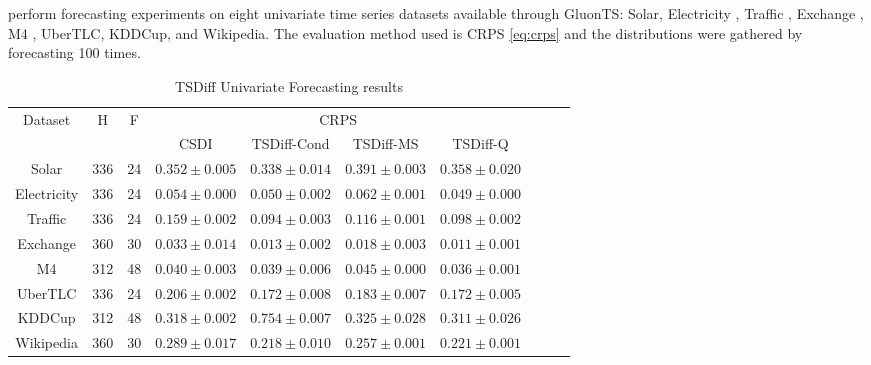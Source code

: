 \textcite{kollovieh_predict_2023} perform forecasting experiments on eight univariate time series datasets available through GluonTS: Solar\cite{lai_modeling_2018}, Electricity \cite{trindade_electricityloaddiagrams20112014_2015}, Traffic \cite{cuturi_pems-sf_2011}, Exchange \cite{lai_modeling_2018}, M4 \cite{makridakis_m4_2020}, UberTLC\cite{nyc_taxi_and_limousine_commission_tlc_2015}, KDDCup\cite{godahewa_monash_2021}, and Wikipedia\cite{gasthaus_probabilistic_2019}. The evaluation method used is CRPS \eqref{eq:crps} and the distributions were gathered by forecasting 100 times.
\begin{table}[ht]
    \centering
    \begin{tabular}{cccccccccc}
        \toprule
        \multirow{2}{*}{Dataset} & \multirow{2}{*}{H} & \multirow{2}{*}{F} & \multicolumn{4}{c}{CRPS} \\
        \cmidrule(lr){4-7}
         & & & CSDI & TSDiff-Cond & TSDiff-MS & TSDiff-Q \\
        \midrule
        Solar & 336 & 24 & $0.352 \pm 0.005$ & $\mathbf{0.338 \pm 0.014}$ & $0.391 \pm 0.003$ & $0.358 \pm 0.020$ \\
        \midrule
        Electricity & 336 & 24 & $0.054 \pm 0.000$ & $0.050 \pm 0.002$ & $0.062 \pm 0.001$ & $\mathbf{0.049 \pm 0.000}$ \\
        \midrule
        Traffic & 336 & 24 & $0.159 \pm 0.002$ & $\mathbf{0.094 \pm 0.003}$ & $0.116 \pm 0.001$ & $0.098 \pm 0.002$ \\
        \midrule
        Exchange & 360 & 30 & $0.033 \pm 0.014$ & $0.013 \pm 0.002$ & $0.018 \pm 0.003$ & $\mathbf{0.011 \pm 0.001}$ \\
        \midrule
        M4 & 312 & 48 & $0.040 \pm 0.003$ & $0.039 \pm 0.006$ & $0.045 \pm 0.000$ & $\mathbf{0.036 \pm 0.001}$ \\
        \midrule
        UberTLC & 336 & 24 & $0.206 \pm 0.002$ & $0.172 \pm 0.008$ & $0.183 \pm 0.007$ & $\mathbf{0.172 \pm 0.005}$ \\
        \midrule
        KDDCup & 312 & 48 & $0.318 \pm 0.002$ & $0.754 \pm 0.007$ & $0.325 \pm 0.028$ & $\mathbf{0.311 \pm 0.026}$ \\
        \midrule
        Wikipedia & 360 & 30 & $0.289 \pm 0.017$ & $\mathbf{0.218 \pm 0.010}$ & $0.257 \pm 0.001$ & $0.221 \pm 0.001$ \\
        \bottomrule
    \end{tabular}
    \caption{TSDiff Univariate Forecasting results \cite{kollovieh_predict_2023}}
    \label{tab:tsdiff-results}
\end{table}


